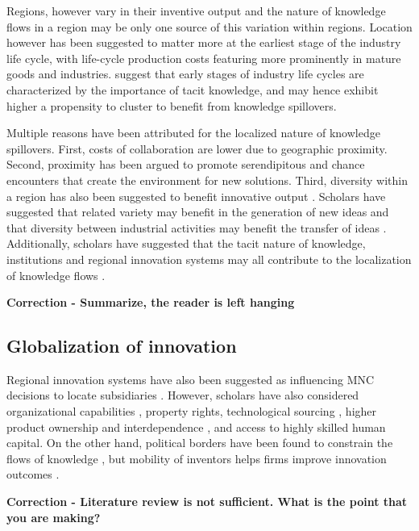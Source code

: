 \documentclass[12pt,letterpaper]{article}
\begin{document}
Regions, however vary in their inventive output \citep*{Agrawal2014b} and the nature of knowledge flows in a region may be only one source of this variation within regions. Location however has been suggested to matter more at the earliest stage of the industry life cycle, with life-cycle production costs featuring more prominently in mature goods and industries. \cite{Audretsch1996b} suggest that early stages of  industry life cycles are characterized by the importance of tacit knowledge, and may hence exhibit higher a propensity to cluster to benefit from knowledge spillovers. \par

Multiple reasons have been attributed for the localized nature of knowledge spillovers. First, costs of collaboration are lower due to geographic proximity. Second, proximity has been argued to promote serendipitous and chance encounters that create the environment for new solutions. Third, diversity within a region has also been suggested to benefit innovative output \citep{Feldman1999}. Scholars have suggested that related variety \citep*{Boschma2009, Frenken2007} may benefit in the generation of new ideas and that diversity between industrial activities may benefit the transfer of ideas \citep{Jacobs1969}. Additionally, scholars have suggested that the tacit nature of knowledge, institutions and regional innovation systems may all contribute to the localization of knowledge flows  \citep{Cooke1996, Maskell1999, Howells1996, Howells2002}.

\textbf{Correction - Summarize, the reader is left hanging}
\subsection{Globalization of innovation}
Regional innovation systems have also been suggested as influencing MNC decisions to locate subsidiaries \citep{Anderson2005}. However, scholars have also considered organizational capabilities \citep{Zhao2006}, property rights, technological sourcing \citep{Florida1997}, higher product ownership and interdependence \citep{Pearce1999}, and access to highly skilled human capital. On the other hand, political borders have been found to constrain the flows of knowledge \citep{Singh2013}, but mobility of inventors helps firms improve innovation outcomes \citep*{Alnuaimi2012b}.

\textbf{Correction - Literature review is not sufficient. What is the point that you are making?}
\end{document}
